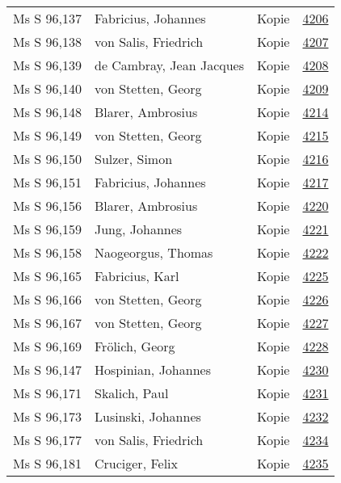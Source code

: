 \documentclass[10pt,a4paper,landscape]{report}
\begin{document}
\begin{longtable}{p{16cm}p{4cm}lr}
Ms S 96,137	&	Fabricius, Johannes	&	Kopie	&	\href{http://130.60.24.72/assignment/4206}{4206}\\
Ms S 96,138	&	von Salis, Friedrich	&	Kopie	&	\href{http://130.60.24.72/assignment/4207}{4207}\\
Ms S 96,139	&	de Cambray, Jean Jacques	&	Kopie	&	\href{http://130.60.24.72/assignment/4208}{4208}\\
Ms S 96,140	&	von Stetten, Georg	&	Kopie	&	\href{http://130.60.24.72/assignment/4209}{4209}\\
Ms S 96,148	&	Blarer, Ambrosius	&	Kopie	&	\href{http://130.60.24.72/assignment/4214}{4214}\\
Ms S 96,149	&	von Stetten, Georg	&	Kopie	&	\href{http://130.60.24.72/assignment/4215}{4215}\\
Ms S 96,150	&	Sulzer, Simon	&	Kopie	&	\href{http://130.60.24.72/assignment/4216}{4216}\\
Ms S 96,151	&	Fabricius, Johannes	&	Kopie	&	\href{http://130.60.24.72/assignment/4217}{4217}\\
Ms S 96,156	&	Blarer, Ambrosius	&	Kopie	&	\href{http://130.60.24.72/assignment/4220}{4220}\\
Ms S 96,159	&	Jung, Johannes	&	Kopie	&	\href{http://130.60.24.72/assignment/4221}{4221}\\
Ms S 96,158	&	Naogeorgus, Thomas	&	Kopie	&	\href{http://130.60.24.72/assignment/4222}{4222}\\
Ms S 96,165	&	Fabricius, Karl	&	Kopie	&	\href{http://130.60.24.72/assignment/4225}{4225}\\
Ms S 96,166	&	von Stetten, Georg	&	Kopie	&	\href{http://130.60.24.72/assignment/4226}{4226}\\
Ms S 96,167	&	von Stetten, Georg	&	Kopie	&	\href{http://130.60.24.72/assignment/4227}{4227}\\
Ms S 96,169	&	Frölich, Georg	&	Kopie	&	\href{http://130.60.24.72/assignment/4228}{4228}\\
Ms S 96,147	&	Hospinian, Johannes	&	Kopie	&	\href{http://130.60.24.72/assignment/4230}{4230}\\
Ms S 96,171	&	Skalich, Paul	&	Kopie	&	\href{http://130.60.24.72/assignment/4231}{4231}\\
Ms S 96,173	&	Lusinski, Johannes	&	Kopie	&	\href{http://130.60.24.72/assignment/4232}{4232}\\
Ms S 96,177	&	von Salis, Friedrich	&	Kopie	&	\href{http://130.60.24.72/assignment/4234}{4234}\\
Ms S 96,181	&	Cruciger, Felix	&	Kopie	&	\href{http://130.60.24.72/assignment/4235}{4235}\\

\end{longtable}
\end{document}
